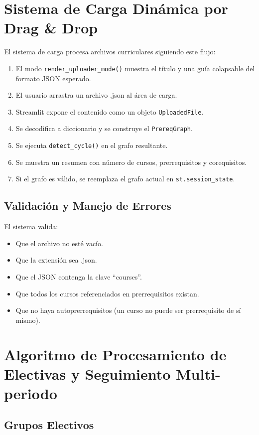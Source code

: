 \documentclass[12pt]{report}
\begin{document}
\section{Sistema de Carga Dinámica por Drag \& Drop}

El sistema de carga procesa archivos curriculares siguiendo este flujo:

\begin{enumerate}
    \item El modo \texttt{render\_uploader\_mode()} muestra el título y una guía colapsable del formato JSON esperado.
    \item El usuario arrastra un archivo .json al área de carga.
    \item Streamlit expone el contenido como un objeto \texttt{UploadedFile}.
    \item Se decodifica a diccionario y se construye el \texttt{PrereqGraph}.
    \item Se ejecuta \texttt{detect\_cycle()} en el grafo resultante.
    \item Se muestra un resumen con número de cursos, prerrequisitos y corequisitos.
    \item Si el grafo es válido, se reemplaza el grafo actual en \texttt{st.session\_state}.
\end{enumerate}

\subsection{Validación y Manejo de Errores}

El sistema valida:
\begin{itemize}
    \item Que el archivo no esté vacío.
    \item Que la extensión sea .json.
    \item Que el JSON contenga la clave ``courses''.
    \item Que todos los cursos referenciados en prerrequisitos existan.
    \item Que no haya autoprerrequisitos (un curso no puede ser prerrequisito de sí mismo).
\end{itemize}

\section{Algoritmo de Procesamiento de Electivas y Seguimiento Multi-periodo}

\subsection{Grupos Electivos}
\end{document}
